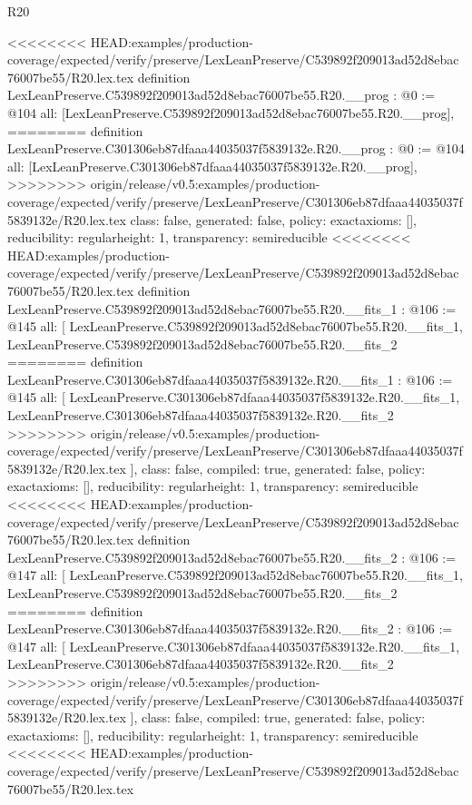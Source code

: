 \begin{lexlean}{R20}
\begin{coremodule}
<<<<<<<< HEAD:examples/production-coverage/expected/verify/preserve/LexLeanPreserve/C539892f209013ad52d8ebac76007be55/R20.lex.tex
definition LexLeanPreserve.C539892f209013ad52d8ebac76007be55.R20.__prog : @0 := @104 {
  all: [LexLeanPreserve.C539892f209013ad52d8ebac76007be55.R20.__prog],
========
definition LexLeanPreserve.C301306eb87dfaaa44035037f5839132e.R20.__prog : @0 := @104 {
  all: [LexLeanPreserve.C301306eb87dfaaa44035037f5839132e.R20.__prog],
>>>>>>>> origin/release/v0.5:examples/production-coverage/expected/verify/preserve/LexLeanPreserve/C301306eb87dfaaa44035037f5839132e/R20.lex.tex
  class: false,
  generated: false,
  policy: exact{axioms: []},
  reducibility: regular{height: 1},
  transparency: semireducible
}
<<<<<<<< HEAD:examples/production-coverage/expected/verify/preserve/LexLeanPreserve/C539892f209013ad52d8ebac76007be55/R20.lex.tex
definition LexLeanPreserve.C539892f209013ad52d8ebac76007be55.R20.__fits_1 : @106 := @145 {
  all: [
    LexLeanPreserve.C539892f209013ad52d8ebac76007be55.R20.__fits_1,
    LexLeanPreserve.C539892f209013ad52d8ebac76007be55.R20.__fits_2
========
definition LexLeanPreserve.C301306eb87dfaaa44035037f5839132e.R20.__fits_1 : @106 := @145 {
  all: [
    LexLeanPreserve.C301306eb87dfaaa44035037f5839132e.R20.__fits_1,
    LexLeanPreserve.C301306eb87dfaaa44035037f5839132e.R20.__fits_2
>>>>>>>> origin/release/v0.5:examples/production-coverage/expected/verify/preserve/LexLeanPreserve/C301306eb87dfaaa44035037f5839132e/R20.lex.tex
  ],
  class: false,
  compiled: true,
  generated: false,
  policy: exact{axioms: []},
  reducibility: regular{height: 1},
  transparency: semireducible
}
<<<<<<<< HEAD:examples/production-coverage/expected/verify/preserve/LexLeanPreserve/C539892f209013ad52d8ebac76007be55/R20.lex.tex
definition LexLeanPreserve.C539892f209013ad52d8ebac76007be55.R20.__fits_2 : @106 := @147 {
  all: [
    LexLeanPreserve.C539892f209013ad52d8ebac76007be55.R20.__fits_1,
    LexLeanPreserve.C539892f209013ad52d8ebac76007be55.R20.__fits_2
========
definition LexLeanPreserve.C301306eb87dfaaa44035037f5839132e.R20.__fits_2 : @106 := @147 {
  all: [
    LexLeanPreserve.C301306eb87dfaaa44035037f5839132e.R20.__fits_1,
    LexLeanPreserve.C301306eb87dfaaa44035037f5839132e.R20.__fits_2
>>>>>>>> origin/release/v0.5:examples/production-coverage/expected/verify/preserve/LexLeanPreserve/C301306eb87dfaaa44035037f5839132e/R20.lex.tex
  ],
  class: false,
  compiled: true,
  generated: false,
  policy: exact{axioms: []},
  reducibility: regular{height: 1},
  transparency: semireducible
}
<<<<<<<< HEAD:examples/production-coverage/expected/verify/preserve/LexLeanPreserve/C539892f209013ad52d8ebac76007be55/R20.lex.tex
}}}
\end{coremodule}
\end{lexlean}
